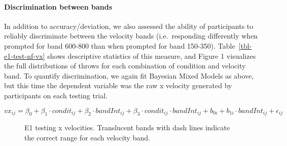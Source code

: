 \documentclass[
  letterpaper,
  DIV=11,
  numbers=noendperiod,
  oneside]{scrartcl}
\let\oldparagraph\paragraph
\renewcommand{\paragraph}[1]{\oldparagraph{#1}\mbox{}}
\begin{document}
\paragraph{Discrimination between
bands}\label{discrimination-between-bands}

In addition to accuracy/deviation, we also assessed the ability of
participants to reliably discriminate between the velocity bands
(i.e.~responding differently when prompted for band 600-800 than when
prompted for band 150-350). Table~\ref{tbl-e1-test-nf-vx} shows
descriptive statistics of this measure, and Figure 1 visualizes the full
distributions of throws for each combination of condition and velocity
band. To quantify discrimination, we again fit Bayesian Mixed Models as
above, but this time the dependent variable was the raw x velocity
generated by participants on each testing trial.

\begin{equation}
vx_{ij} = \beta_0 + \beta_1 \cdot condit_{ij} + \beta_2 \cdot bandInt_{ij} + \beta_3 \cdot condit_{ij} \cdot bandInt_{ij} + b_{0i} + b_{1i} \cdot bandInt_{ij} + \epsilon_{ij}
\end{equation}

\begin{figure}


\caption{\label{fig-e1-test-vx}E1 testing x velocities. Translucent
bands with dash lines indicate the correct range for each velocity
band.}

\end{figure}%
\end{document}
